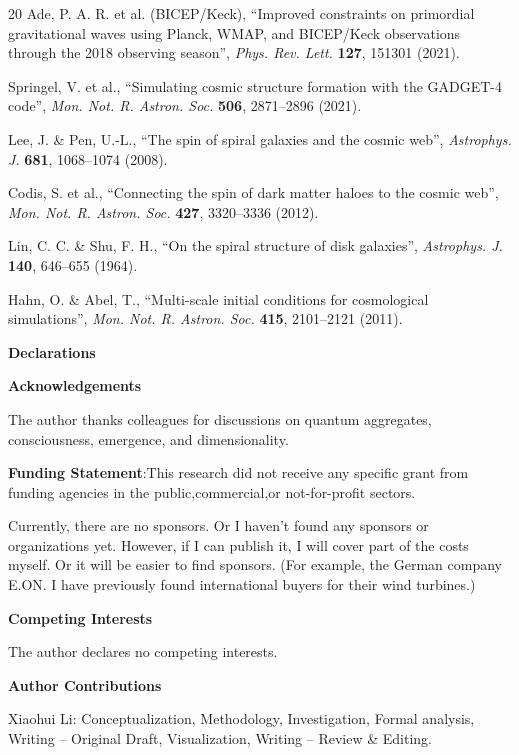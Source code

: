 \documentclass[a4paper,10pt]{article}
\begin{document}
\begin{thebibliography}{20}
Ade, P. A. R. et al. (BICEP/Keck),
``Improved constraints on primordial gravitational waves using Planck, WMAP,
and BICEP/Keck observations through the 2018 observing season'',
\textit{Phys. Rev. Lett.} \textbf{127}, 151301 (2021).

Springel, V. et al.,
``Simulating cosmic structure formation with the GADGET-4 code'',
\textit{Mon. Not. R. Astron. Soc.} \textbf{506}, 2871--2896 (2021).

Lee, J. \& Pen, U.-L.,
``The spin of spiral galaxies and the cosmic web'',
\textit{Astrophys. J.} \textbf{681}, 1068--1074 (2008).

Codis, S. et al.,
``Connecting the spin of dark matter haloes to the cosmic web'',
\textit{Mon. Not. R. Astron. Soc.} \textbf{427}, 3320--3336 (2012).

Lin, C. C. \& Shu, F. H.,
``On the spiral structure of disk galaxies'',
\textit{Astrophys. J.} \textbf{140}, 646--655 (1964).

Hahn, O. \& Abel, T.,
``Multi-scale initial conditions for cosmological simulations'',
\textit{Mon. Not. R. Astron. Soc.} \textbf{415}, 2101--2121 (2011).

\end{thebibliography}
\textbf{\textbf{Declarations}}

  \textbf{\textbf{Acknowledgements}}

The author thanks colleagues for discussions on quantum aggregates, consciousness, emergence, and dimensionality. 

 \textbf{\textbf{Funding Statement}}:This research did not receive any specific grant from funding agencies in the public,commercial,or not-for-profit sectors.

Currently, there are no sponsors. Or I haven't found any sponsors or organizations yet. However, if I can publish it, I will cover part of the costs myself. Or it will be easier to find sponsors. (For example, the German company E.ON. I have previously found international buyers for their wind turbines.)

 \textbf{\textbf{Competing Interests}}

The author declares no competing interests.

 \textbf{\textbf{Author Contributions}}

Xiaohui Li: Conceptualization, Methodology, Investigation, Formal analysis, Writing – Original Draft, Visualization, Writing – Review \& Editing.
\end{document}
